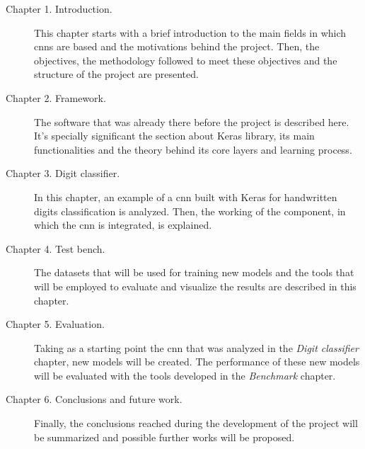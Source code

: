 \begin{description}
	\item[Chapter 1. Introduction.] This chapter starts with a brief introduction to the main fields in which \glspl{cnn} are based and the motivations behind the project. Then, the objectives, the methodology followed to meet these objectives and the structure of the project are presented.
	\item[Chapter 2. Framework.] The software that was already there before the project is described here. It's specially significant the section about Keras library, its main functionalities and the theory behind its core layers and learning process.
	\item[Chapter 3. Digit classifier.] In this chapter, an example of a \gls{cnn} built with Keras for handwritten digits classification is analyzed. Then, the working of the component, in which the \gls{cnn} is integrated, is explained.
	\item[Chapter 4. Test bench.] The datasets that will be used for training new models and the tools that will be employed to evaluate and visualize the results are described in this chapter.
	\item[Chapter 5. Evaluation.] Taking as a starting point the \gls{cnn} that was analyzed in the \textit{Digit classifier} chapter, new models will be created. The performance of these new models will be evaluated with the tools developed in the \textit{Benchmark} chapter.
	\item[Chapter 6. Conclusions and future work.] Finally, the conclusions reached during the development of the project will be summarized and possible further works will be proposed.
\end{description}
